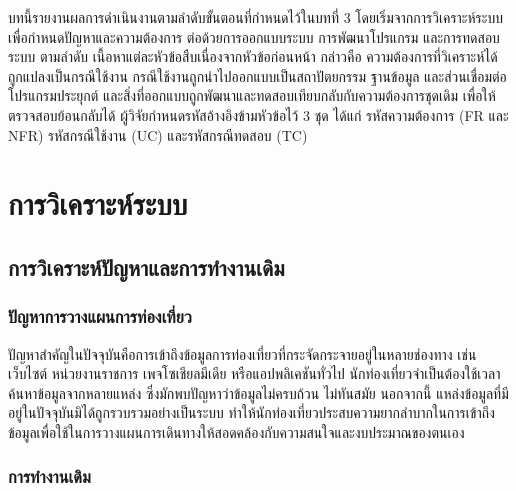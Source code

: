 
บทนี้รายงานผลการดำเนินงานตามลำดับขั้นตอนที่กำหนดไว้ในบทที่ 3 โดยเริ่มจากการวิเคราะห์ระบบเพื่อกำหนดปัญหาและความต้องการ ต่อด้วยการออกแบบระบบ การพัฒนาโปรแกรม และการทดสอบระบบ ตามลำดับ เนื้อหาแต่ละหัวข้อสืบเนื่องจากหัวข้อก่อนหน้า กล่าวคือ ความต้องการที่วิเคราะห์ได้ถูกแปลงเป็นกรณีใช้งาน กรณีใช้งานถูกนำไปออกแบบเป็นสถาปัตยกรรม ฐานข้อมูล และส่วนเชื่อมต่อโปรแกรมประยุกต์ และสิ่งที่ออกแบบถูกพัฒนาและทดสอบเทียบกลับกับความต้องการชุดเดิม เพื่อให้ตรวจสอบย้อนกลับได้ ผู้วิจัยกำหนดรหัสอ้างอิงข้ามหัวข้อไว้ 3 ชุด ได้แก่ รหัสความต้องการ (FR และ NFR) รหัสกรณีใช้งาน (UC) และรหัสกรณีทดสอบ (TC)

\section{การวิเคราะห์ระบบ}

\subsection{การวิเคราะห์ปัญหาและการทำงานเดิม}

\subsubsection{ปัญหาการวางแผนการท่องเที่ยว}

ปัญหาสำคัญในปัจจุบันคือการเข้าถึงข้อมูลการท่องเที่ยวที่กระจัดกระจายอยู่ในหลายช่องทาง เช่น เว็บไซต์ หน่วยงานราชการ เพจโซเชียลมีเดีย หรือแอปพลิเคชันทั่วไป นักท่องเที่ยวจำเป็นต้องใช้เวลาค้นหาข้อมูลจากหลายแหล่ง ซึ่งมักพบปัญหาว่าข้อมูลไม่ครบถ้วน ไม่ทันสมัย นอกจากนี้ แหล่งข้อมูลที่มีอยู่ในปัจจุบันมิได้ถูกรวบรวมอย่างเป็นระบบ ทำให้นักท่องเที่ยวประสบความยากลำบากในการเข้าถึงข้อมูลเพื่อใช้ในการวางแผนการเดินทางให้สอดคล้องกับความสนใจและงบประมาณของตนเอง

\subsubsection{การทำงานเดิม}

